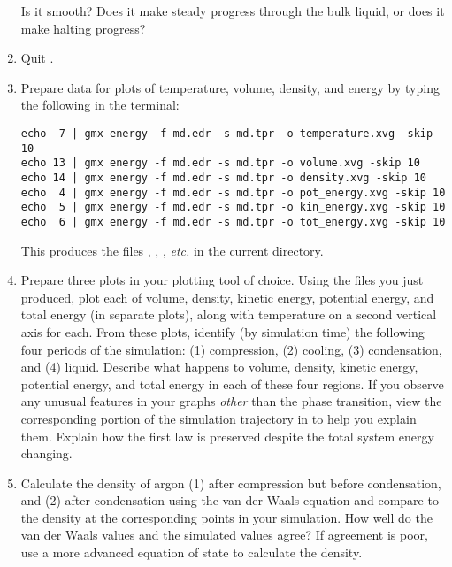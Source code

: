 \documentclass{article}
\begin{document}
\begin{enumerate}
    Is it smooth?
    Does it make steady progress through the bulk liquid, or does it make halting progress?
  \item Quit .
  \item Prepare data for plots of temperature, volume, density, and energy by typing the following in the terminal:
\begin{Verbatim}
echo  7 | gmx energy -f md.edr -s md.tpr -o temperature.xvg -skip 10
echo 13 | gmx energy -f md.edr -s md.tpr -o volume.xvg -skip 10
echo 14 | gmx energy -f md.edr -s md.tpr -o density.xvg -skip 10
echo  4 | gmx energy -f md.edr -s md.tpr -o pot_energy.xvg -skip 10
echo  5 | gmx energy -f md.edr -s md.tpr -o kin_energy.xvg -skip 10
echo  6 | gmx energy -f md.edr -s md.tpr -o tot_energy.xvg -skip 10
\end{Verbatim}
    This produces the files , , , \emph{etc.} in the current directory.%
  \item Prepare three plots in your plotting tool of choice.
    Using the  files you just produced, plot each of volume, density, kinetic energy, potential energy, and total energy (in separate plots), along with temperature on a second vertical axis for each.
    From these plots, identify (by simulation time) the following four periods of the simulation: (1) compression, (2) cooling, (3) condensation, and (4) liquid.
    Describe what happens to volume, density, kinetic energy, potential energy, and total energy in each of these four regions.
    If you observe any unusual features in your graphs \emph{other} than the phase transition, view the corresponding portion of the simulation trajectory in  to help you explain them.
    Explain how the first law is preserved despite the total system energy changing.
  \item Calculate the density of argon (1) after compression but before condensation, and (2) after condensation using the van der Waals equation and compare to the density at the corresponding points in your simulation.
    How well do the van der Waals values and the simulated values agree?
    If agreement is poor, use a more advanced equation of state to calculate the density.

\end{enumerate}
\end{document}
